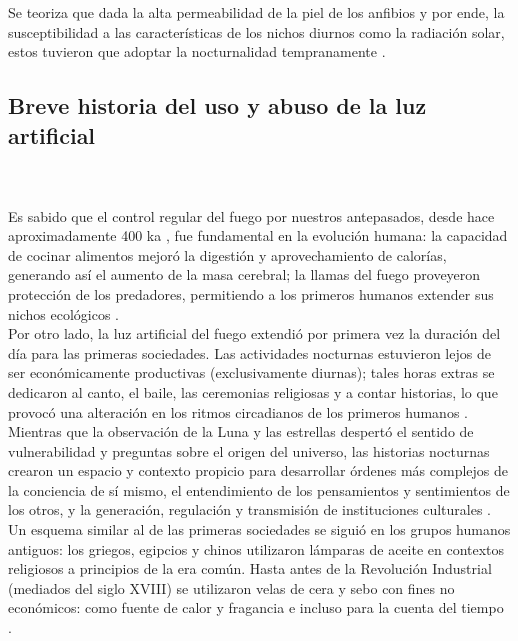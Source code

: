 Se teoriza que dada la alta permeabilidad de la piel de los anfibios y por ende, la susceptibilidad a las características de los nichos diurnos como la radiación solar, estos tuvieron que adoptar la nocturnalidad tempranamente \citep{Holker2010}.

\newpage

\subsection{Breve historia del uso y abuso de la luz artificial}\\
\\

Es sabido que el control regular del fuego por nuestros antepasados, desde hace aproximadamente 400 ka \citep{Dunbar2014}, fue fundamental en la evolución humana: la capacidad de cocinar alimentos mejoró la digestión y aprovechamiento de calorías, generando así el aumento de la masa cerebral; la llamas del fuego proveyeron protección de los predadores, permitiendo a los primeros humanos extender sus nichos ecológicos \citep{Wrangham2010}.\\

Por otro lado, la luz artificial del fuego extendió por primera vez la duración del día para las primeras sociedades. Las actividades nocturnas estuvieron lejos de ser económicamente productivas (exclusivamente diurnas); tales horas extras se dedicaron al canto, el baile, las ceremonias religiosas y a contar historias, lo que provocó una alteración en los ritmos circadianos de los primeros humanos \citep{Wiessner2014}.\\

Mientras que la observación de la Luna y las estrellas despertó el sentido de vulnerabilidad y preguntas sobre el origen del universo, las historias nocturnas crearon un espacio y contexto propicio para desarrollar órdenes más complejos de la conciencia de sí mismo, el entendimiento de los pensamientos y sentimientos de los otros, y la generación, regulación y transmisión de instituciones culturales \citep{Wiessner2014}.\\

Un esquema similar al de las primeras sociedades se siguió en los grupos humanos antiguos: los griegos, egipcios y chinos utilizaron lámparas de aceite en contextos religiosos a principios de la era común. Hasta antes de la Revolución Industrial (mediados del siglo XVIII) se utilizaron velas de cera y sebo con fines no económicos: como fuente de calor y fragancia e incluso para la cuenta del tiempo \citep{Duvall1988}.\\

